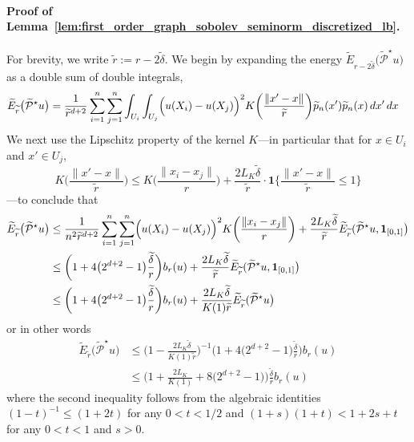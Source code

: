 \documentclass[twoside]{article}
\newcommand{\1}{\mathbf{1}}
\newcommand{\mc}[1]{\mathcal{#1}}
\newcommand{\wt}[1]{\widetilde{#1}}
\theoremstyle{definition}
\theoremstyle{remark}
\begin{document}
\paragraph{Proof of Lemma~\ref{lem:first_order_graph_sobolev_seminorm_discretized_lb}.}
For brevity, we write $\wt{r} := r - 2\wt{\delta}$. We begin by expanding the energy $\wt{E}_{r - 2\wt{\delta}}\bigl(\wt{\mc{P}}^{\star}u\bigr)$ as a double sum of double integrals,
\begin{align*}
\wt{E}_{\wt{r}}\bigl(\wt{\mc{P}}^{\star}u\bigr) & = \frac{1}{\wt{r}^{d + 2}} \sum_{i = 1}^{n} \sum_{j = 1}^{n} \int_{U_i} \int_{U_j} \Bigl(u(X_i) - u(X_j)\Bigr)^2 K\biggl(\frac{\|x' - x\|}{\wt{r}}\biggr) \wt{p}_n(x') \wt{p}_n(x) \,dx' \,dx
\end{align*}
We next use the Lipschitz property of the kernel $K$---in particular that for $x \in U_i$ and $x' \in U_j$,
\begin{equation*}
K\biggl(\frac{\|x' - x\|}{\wt{r}}\biggr) \leq K\biggl(\frac{\|x_i - x_j\|}{r}\biggr) + \frac{2L_K\wt{\delta}}{\wt{r}} \cdot \1\biggl\{\frac{\|x' - x\|}{\wt{r}} \leq 1\biggr\}
\end{equation*}
---to conclude that
\begin{align}
\wt{E}_{\wt{r}}\bigl(\wt{\mc{P}}^{\star}u\bigr) & \leq \frac{1}{n^2\wt{r}^{d + 2}} \sum_{i = 1}^{n} \sum_{j = 1}^{n} \Bigl(u(X_i) - u(X_j)\Bigr)^2 K\biggl(\frac{\|x_i - x_j\|}{r}\biggr) + \frac{2L_K\wt{\delta}}{\wt{r}}\wt{E}_{\wt{r}}(\wt{\mc{P}}^{\star}u,\1_{[0,1]}\bigr) \nonumber \\
& \leq \biggl(1 + 4\bigl(2^{d + 2} - 1\bigr)\frac{\wt{\delta}}{r}\biggr) b_r(u) + \frac{2L_K\wt{\delta}}{\wt{r}}\wt{E}_{\wt{r}}(\wt{\mc{P}}^{\star}u,\1_{[0,1]}\bigr) \nonumber \\
& \leq \biggl(1 + 4\bigl(2^{d + 2} - 1\bigr)\frac{\wt{\delta}}{r}\biggr) b_r(u) + \frac{2L_K\wt{\delta}}{K(1)\wt{r}} \wt{E}_{\wt{r}}(\wt{\mc{P}}^{\star}u\bigr) \nonumber 
\end{align}
or in other words
\begin{align*}
\wt{E}_{\wt{r}}\bigl(\wt{\mc{P}}^{\star}u\bigr) & \leq \biggl(1 - \frac{2L_K\wt{\delta}}{K(1)\wt{r}}\biggr)^{-1}\biggl(1 + 4\bigl(2^{d + 2} - 1\bigr)\frac{\wt{\delta}}{r}\biggr) b_r(u) \\
& \leq \biggl(1 + \frac{2L_K}{K(1)} + 8\bigl(2^{d + 2} - 1\bigr)\biggr) \frac{\wt{\delta}}{r}b_r(u)
\end{align*}
where the second inequality follows from the algebraic identities $(1 - t)^{-1} \leq (1 + 2t)$ for any $0 < t < 1/2$ and $(1 + s)(1 + t) < 1 + 2s + t$ for any $0 < t < 1$ and $s > 0$.
\end{document}
